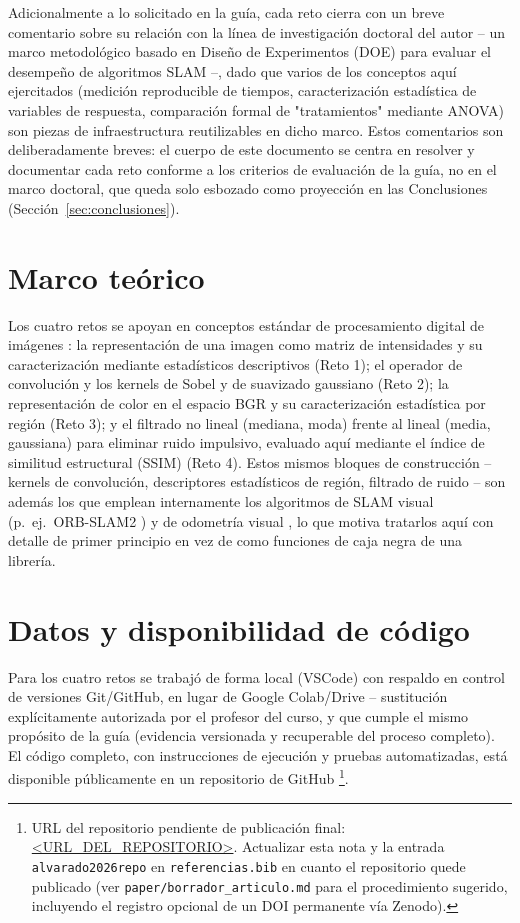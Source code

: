 \documentclass[11pt]{article}
\begin{document}
Adicionalmente a lo solicitado en la guía, cada reto cierra con un breve
comentario sobre su relación con la línea de investigación doctoral del
autor -- un marco metodológico basado en Diseño de Experimentos (DOE)
\citep{montgomery2019design} para evaluar el desempeño de algoritmos SLAM
\citep{cadena2016past} --, dado que varios de los conceptos aquí ejercitados
(medición reproducible de tiempos, caracterización estadística de variables
de respuesta, comparación formal de "tratamientos" mediante ANOVA) son
piezas de infraestructura reutilizables en dicho marco. Estos comentarios
son deliberadamente breves: el cuerpo de este documento se centra en
resolver y documentar cada reto conforme a los criterios de evaluación de
la guía, no en el marco doctoral, que queda solo esbozado como proyección
en las Conclusiones (Sección~\ref{sec:conclusiones}).

\section{Marco teórico}
Los cuatro retos se apoyan en conceptos estándar de procesamiento digital
de imágenes \citep{gonzalez2018digital}: la representación de una imagen
como matriz de intensidades y su caracterización mediante estadísticos
descriptivos (Reto 1); el operador de convolución y los kernels de Sobel y
de suavizado gaussiano (Reto 2); la representación de color en el espacio
BGR y su caracterización estadística por región (Reto 3); y el filtrado no
lineal (mediana, moda) frente al lineal (media, gaussiana) para eliminar
ruido impulsivo, evaluado aquí mediante el índice de similitud estructural
(SSIM) \citep{wang2004ssim} (Reto 4). Estos mismos bloques de
construcción -- kernels de convolución, descriptores estadísticos de
región, filtrado de ruido -- son además los que emplean internamente los
algoritmos de SLAM visual (p.~ej.\ ORB-SLAM2 \citep{murartal2017orbslam2})
y de odometría visual \citep{scaramuzza2011visualodometry}, lo que motiva
tratarlos aquí con detalle de primer principio en vez de como funciones de
caja negra de una librería.

\section{Datos y disponibilidad de código}
\label{sec:datos-codigo}
Para los cuatro retos se trabajó de forma local (VSCode) con respaldo en
control de versiones Git/GitHub, en lugar de Google Colab/Drive -- sustitución
explícitamente autorizada por el profesor del curso, y que cumple el mismo
propósito de la guía (evidencia versionada y recuperable del proceso
completo). El código completo, con instrucciones de ejecución y pruebas
automatizadas, está disponible públicamente en un repositorio de GitHub
\citep{alvarado2026repo}\footnote{URL del repositorio pendiente de
publicación final: \url{<URL\_DEL\_REPOSITORIO>}. Actualizar esta nota y la
entrada \texttt{alvarado2026repo} en \texttt{referencias.bib} en cuanto el
repositorio quede publicado (ver \texttt{paper/borrador\_articulo.md} para
el procedimiento sugerido, incluyendo el registro opcional de un DOI
permanente vía Zenodo).}.
\end{document}
